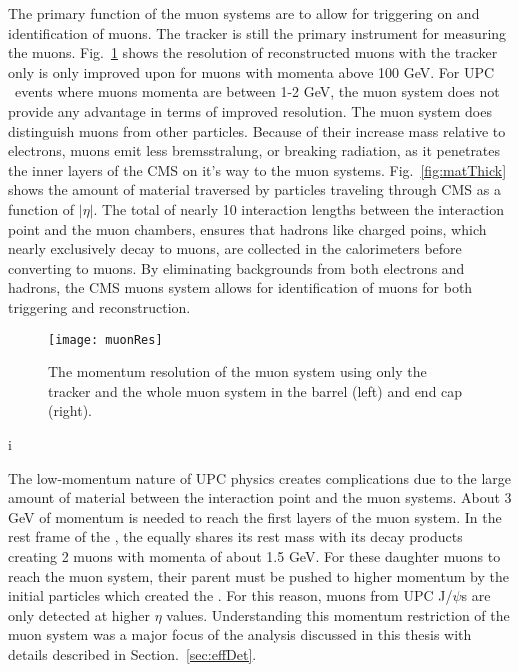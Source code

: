     The primary function of the muon systems are to allow for triggering on and
      identification of muons.
    The tracker is still the primary instrument for measuring the muons. 
    Fig.~\ref{fig:muonRes} shows the resolution of reconstructed muons with 
      the tracker only is only improved upon for muons with momenta above 
      100 GeV. 
    For UPC \JPsi~events where muons momenta are between 1-2 GeV, the muon
      system does not provide any advantage in terms of improved resolution.
    The muon system does distinguish muons from other particles.
    Because of their increase mass relative to electrons, muons emit less 
      bremsstralung, or breaking radiation, as it penetrates the inner layers
      of the CMS on it's way to the muon systems.
    Fig.~\ref{fig:matThick} shows the amount of material traversed by particles
      traveling through CMS as a function of $|\eta|$.
    The total of nearly 10 interaction lengths between the interaction point 
      and the muon chambers, ensures that hadrons like charged poins, which
      nearly exclusively decay to muons, are collected in the calorimeters 
      before converting to muons. 
    By eliminating backgrounds from both electrons and hadrons, the CMS muons 
      system allows for identification of muons for both triggering and 
      reconstruction.
  
    \begin{figure}[!Hhbt]
      \centering
      \texttt{[image: muonRes]}
      \caption{ The momentum resolution of the muon system using only the 
        tracker and the whole muon system in the barrel (left) and end cap 
        (right).}
      \label{fig:muonRes}
    \end{figure}i

    The low-momentum nature of UPC physics creates complications due to the 
      large amount of material between the interaction point and the muon 
      systems.
    About 3 GeV of momentum is needed to reach the first layers of the muon 
      system.
    In the rest frame of the \JPsi, the \JPsi equally shares its rest mass with 
      its decay products creating 2 muons with momenta of about 1.5 GeV.
    For these daughter muons to reach the muon system, their parent \JPsi must
      be pushed to higher momentum by the initial particles which created the
      \JPsi.
    For this reason, muons from UPC J/$\psi$s are only detected at higher 
      $\eta$ values.
    Understanding this momentum restriction of the muon system was a major 
      focus of the analysis discussed in this thesis with details described in 
      Section.~\ref{sec:effDet}.

